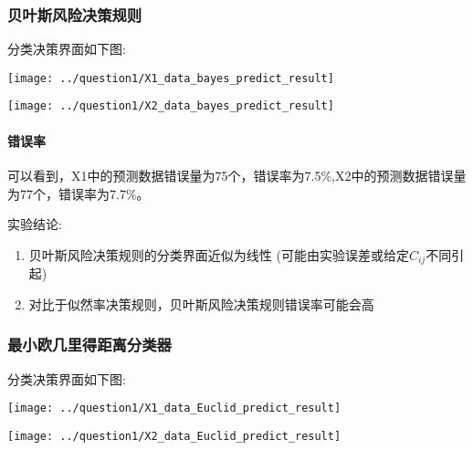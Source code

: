 \documentclass[UTF8]{article} %
\begin{document}
    \subsubsection{贝叶斯风险决策规则}

    分类决策界面如下图:

    \begin{minipage}[t]{0.5\linewidth}
        \centering
        \texttt{[image: ../question1/X1\_data\_bayes\_predict\_result]}
        \label{fig:bayes1} %
    \end{minipage}%
    \begin{minipage}[t]{0.5\linewidth}
        \centering
        \texttt{[image: ../question1/X2\_data\_bayes\_predict\_result]}
        \label{fig:bayes2} %
    \end{minipage}

    \paragraph{错误率}  可以看到，X1中的预测数据错误量为75个，错误率为7.5\%,X2中的预测数据错误量为77个，错误率为7.7\%。

    实验结论:
    \begin{enumerate}
        \item 贝叶斯风险决策规则的分类界面近似为线性 (可能由实验误差或给定$C_{ij}$不同引起)
        \item 对比于似然率决策规则，贝叶斯风险决策规则错误率可能会高
    \end{enumerate}

    \subsubsection{最小欧几里得距离分类器}

    分类决策界面如下图:

    \begin{minipage}[t]{0.5\linewidth}
        \centering
        \texttt{[image: ../question1/X1\_data\_Euclid\_predict\_result]}
        \label{fig:Euclid1} %
    \end{minipage}%
    \begin{minipage}[t]{0.5\linewidth}
        \centering
        \texttt{[image: ../question1/X2\_data\_Euclid\_predict\_result]}
        \label{fig:Euclid2} %
    \end{minipage}
\end{document}
